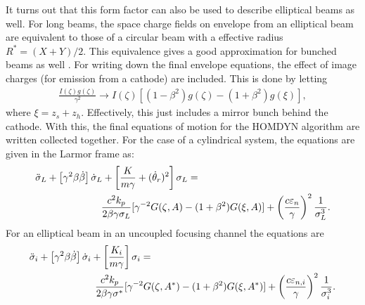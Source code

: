 It turns out that this form factor can also be used to describe elliptical beams
as well. For long beams, the space charge fields on envelope from an elliptical
beam are equivalent to those of a circular beam with a effective radius $R^{*} =
(X+Y)/2$. This equivalence gives a good approximation for bunched beams as well
\cite{HOMY2}. For writing down the final envelope equations, the effect of image
charges (for emission from a cathode) are included. This is done by letting
%
\begin{eqnarray}
\frac{I(\zeta)g(\zeta)}{\gamma^2}\rightarrow I(\zeta)[(1-\beta^2)g(\zeta) - (1+\beta^2)g(\xi) ],\nonumber
\end{eqnarray}
%
where $\xi = z_s + z_h$. Effectively, this just includes a mirror bunch behind
the cathode. With this, the final equations of motion for the HOMDYN algorithm
are written collected together. For the case of a cylindrical system, the
equations are given in the Larmor frame as:
%
\begin{eqnarray}
\lefteqn{\ddot\sigma_L + \left[\gamma^2\beta\dot\beta\right]\dot\sigma_L + \left[\frac{K}{m\gamma}+(\dot\theta_r)^2\right]\sigma_L=} & &
\nonumber
\\
& & \hspace{2cm}\frac{c^2k_p}{2\beta \gamma\sigma_L}[ \gamma^{-2}G(\zeta,A) - (1+\beta^2)G(\xi,A) ]+\left(\frac{c\epsilon_n}{\gamma}\right)^2\frac{1}{\sigma_L^3}.
\end{eqnarray}
%
For an elliptical beam in an uncoupled focusing channel the equations are
%
\begin{eqnarray}
\lefteqn{\ddot\sigma_i + \left[\gamma^2\beta\dot\beta\right]\dot\sigma_i
+ \left[\frac{K_i}{m\gamma}\right]\sigma_i =} &&
\nonumber
\\
&& \hspace{2cm}\frac{c^2k_p}{2\beta\gamma\sigma^*}[ \gamma^{-2}G(\zeta,A^*) - (1+\beta^2)G(\xi,A^*) ]+\left(\frac{c\epsilon_{n,i}}{\gamma}\right)^2\frac{1}{\sigma_i^3}.
\end{eqnarray}
